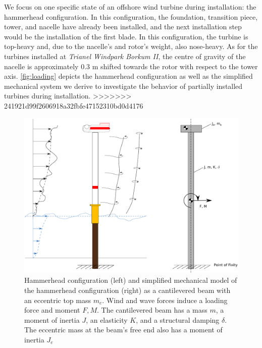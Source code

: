 \documentclass{article}
\begin{document}
We focus on one specific state of an offshore wind turbine during installation: the hammerhead configuration. In this configuration, the foundation, transition piece, tower, and nacelle have already been installed, and the next installation step would be the installation of the first blade. In this configuration, the turbine is top-heavy and, due to the nacelle's and rotor's weight, also nose-heavy. As for the turbines installed at \textit{Trianel Windpark Borkum II}, the centre of gravity of the nacelle is approximately 0.3 m shifted towards the rotor with respect to the tower axis. \autoref{fig:loading} depicts the hammerhead configuration as well as the simplified mechanical system we derive to investigate the behavior of partially installed turbines during installation. 
>>>>>>> 241921d99f2606918a32fbfe47152310bd0d4176

\begin{figure}[ht!]
    \centering
    \includegraphics[width=0.7\linewidth]{figures/loading_3.pdf}
    \caption{Hammerhead configuration (left) and simplified mechanical model of the hammerhead configuration (right) as a cantilevered beam with an eccentric top mass $m_e$. Wind and wave forces induce a loading force and moment $F, M$. The cantilevered beam has a mass $m$, a moment of inertia $J$, an elasticity $K$, and a structural damping $\delta$. The eccentric mass at the beam's free end also has a moment of inertia $J_e$ }
    \label{fig:loading}
\end{figure}
\end{document}
